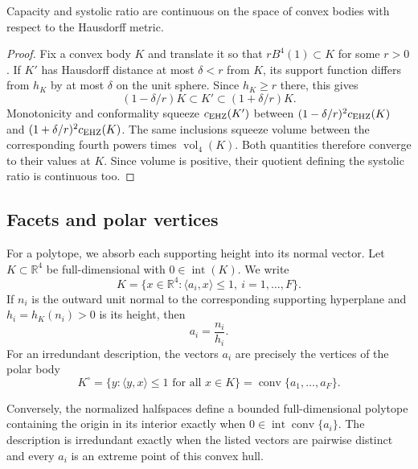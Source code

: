 \begin{proposition}[Continuity]\label{prop:preliminaries-sys-hausdorff-continuity}
Capacity and systolic ratio are continuous on the space of convex bodies
with respect to the Hausdorff metric.
\end{proposition}

\begin{proof}
Fix a convex body $K$ and translate it so that $rB^4(1)\subset K$ for
some $r>0$. If $K'$ has Hausdorff distance at most $\delta<r$ from $K$,
its support function differs from $h_K$ by at most $\delta$ on the unit
sphere. Since $h_K\geq r$ there, this gives
\[
 (1-\delta/r)K\subset K'\subset(1+\delta/r)K.
\]
Monotonicity and conformality squeeze $c_{\rm EHZ}(K')$ between
$(1-\delta/r)^2c_{\rm EHZ}(K)$ and
$(1+\delta/r)^2c_{\rm EHZ}(K)$. The same inclusions squeeze volume between
the corresponding fourth powers times $\operatorname{vol}_4(K)$.
Both quantities therefore converge to their values at $K$. Since volume
is positive, their quotient defining the systolic ratio is continuous too.
\end{proof}

\subsection{Facets and polar vertices}
\label{subsec:preliminaries-polytope-input-language}

For a polytope, we absorb each supporting height into its normal vector. Let
\(K\subset\mathbb R^4\) be full-dimensional with
\(0\in\operatorname{int}(K)\). We write
\begin{equation}\label{eq:preliminaries-normalized-halfspaces}
  K=\{x\in\mathbb R^4:\langle a_i,x\rangle\leq1,
    \ i=1,\ldots,F\}.
\end{equation}
If \(n_i\) is the outward unit normal to the corresponding supporting
hyperplane and \(h_i=h_K(n_i)>0\) is its height, then
\[
  a_i=\frac{n_i}{h_i}.
\]
For an irredundant description, the vectors \(a_i\) are precisely the vertices
of the polar body
\[
  K^\circ=\{y:\langle y,x\rangle\leq1\text{ for all }x\in K\}
  =\operatorname{conv}\{a_1,\ldots,a_F\}.
\]


Conversely, the normalized halfspaces define a bounded full-dimensional
polytope containing the origin in its interior exactly when
\(0\in\operatorname{int}\operatorname{conv}\{a_i\}\).  The description is
irredundant exactly when the listed vectors are pairwise distinct and every
\(a_i\) is an extreme point of this convex hull.

